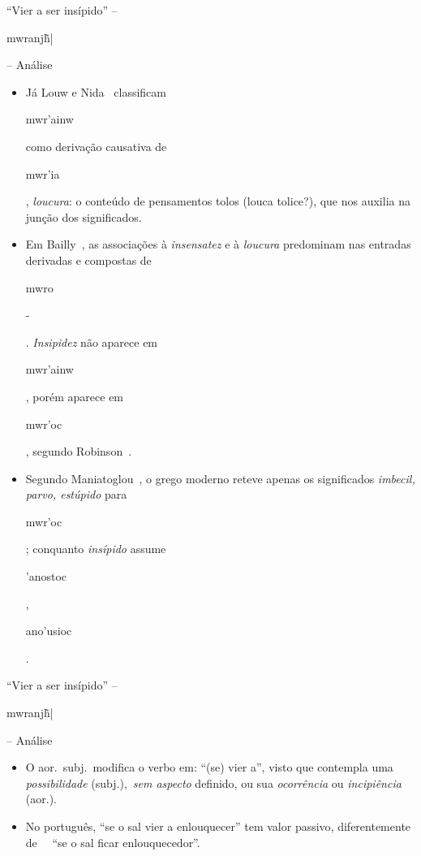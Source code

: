 \documentclass[12pt,aspectratio=169]{beamer}
\newcommand{\RED}[1]{{\textcolor{TXred}{#1}}}
\newcommand{\ORA}[1]{{\textcolor{TXora}{#1}}}
\newcommand{\YEL}[1]{{\textcolor{TXyel}{#1}}}
\newcommand{\GRE}[1]{{\textcolor{TXgre}{#1}}}
\newcommand{\CYA}[1]{{\textcolor{TXcya}{#1}}}
\newcommand{\MAG}[1]{{\textcolor{TXmag}{#1}}}
\newcommand{\BRI}[1]{{\textcolor{BSpbg}{#1}}}   %
\newcommand{\GRtxt}[1]{\begin{otherlanguage}{greek}{{#1}}\end{otherlanguage}}
\begin{document}
    \begin{frame}{\BRI{``Vier a ser insípido''} -- \BRI{\GRtxt{mwranj\~h|}} -- \BRI{Análise}}
        \begin{itemize}
            \item<1-> Já \BRI{Louw e Nida}~\cite{2003-LouwJP+NidaEA-SBB} classificam
                \YEL{\GRtxt{mwr'ainw}} como derivação causativa de \YEL{\GRtxt{mwr'ia}},
                \CYA{\textit{loucura}}: o conteúdo de pensamentos tolos \ORA{(louca tolice?)},
                que nos auxilia na junção dos significados.
                \\[\bigskipamount]
            \item<2-> Em \BRI{Bailly}~\cite{2000-BaillyA-Hachette}, as associações à
                \CYA{\textit{insensatez}} e à \CYA{\textit{loucura}} predominam nas entradas
                derivadas e compostas de \YEL{\GRtxt{mwro}-}. \CYA{\textit{Insipidez}} não
                aparece em \YEL{\GRtxt{mwr'ainw}}, porém aparece em \YEL{\GRtxt{mwr'oc}},
                segundo \BRI{Robinson}~\cite{2012-RobinsonE-CPAD}.
                \\[\bigskipamount]
            \item<3-> Segundo \BRI{Maniatoglou}~\cite{1997-ManiatoglouMPF-Porto}, o grego
                moderno reteve apenas os significados \CYA{\textit{imbecil, parvo, estúpido}}
                para \YEL{\GRtxt{mwr'oc}}; conquanto \CYA{\textit{insípido}} assume
                \YEL{\GRtxt{'anostoc}}, \YEL{\GRtxt{ano'usioc}}.
        \end{itemize}
    \end{frame}

    \begin{frame}{\BRI{``Vier a ser insípido''} -- \BRI{\GRtxt{mwranj\~h|}} -- \BRI{Análise}}
        \begin{itemize}
            \item<1-> 
                O \GRE{aor.~subj.}~modifica o verbo em: \CYA{``}(se) \CYA{vier a''}, visto
                que contempla uma \BRI{\textit{possibilidade}} (\GRE{subj.}),~\BRI{\textit{sem
                aspecto}} definido, ou sua \BRI{\textit{ocorrência}} ou
                \BRI{\textit{incipiência}} (\GRE{aor.}).
                \\[\medskipamount]
            \item<2-> No português, \MAG{``se o sal vier a enlouquecer''} tem valor
                \GRE{passivo}, diferentemente de \ \ \RED{``se o sal ficar enlouquecedor''}.
                \\[\medskipamount]
        \end{itemize}
    \end{frame}
\end{document}
